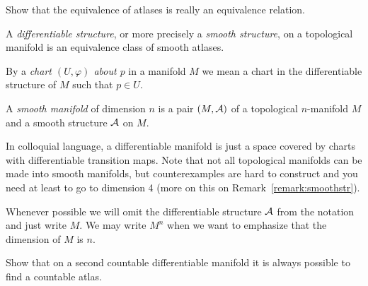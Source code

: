 \begin{exercise}
  Show that the equivalence of atlases is really an equivalence relation.
\end{exercise}

\begin{definition}\label{def:diffstr}
  A \emph{differentiable structure}, or more precisely a \emph{smooth structure}, on a topological manifold is an equivalence class of smooth atlases.
\end{definition}

\begin{notation}
  By a \emph{chart $(U, \varphi)$ about $p$} in a manifold $M$ we mean a chart in the differentiable structure of $M$ such that $p\in U$.
\end{notation}

\begin{definition}\label{def:diffmanifold}
  A \emph{smooth manifold} of dimension $n$ is a pair $(M, \mathcal{A})$ of a topological $n$-manifold $M$ and a smooth structure $\mathcal{A}$ on $M$.
\end{definition}

In colloquial language, a differentiable manifold is just a space covered by charts with differentiable transition maps.
Note that not all topological manifolds can be made into smooth manifolds, but counterexamples are hard to construct and you need at least to go to dimension 4 (more on this on Remark~\ref{remark:smoothstr}).

\begin{notation}
  Whenever possible we will omit the differentiable structure $\mathcal{A}$ from the notation and just write $M$.
  We may write $M^n$ when we want to emphasize that the dimension of $M$ is $n$.
\end{notation}

\begin{exercise}
  Show that on a second countable differentiable manifold it is always possible to find a countable atlas.
\end{exercise}

